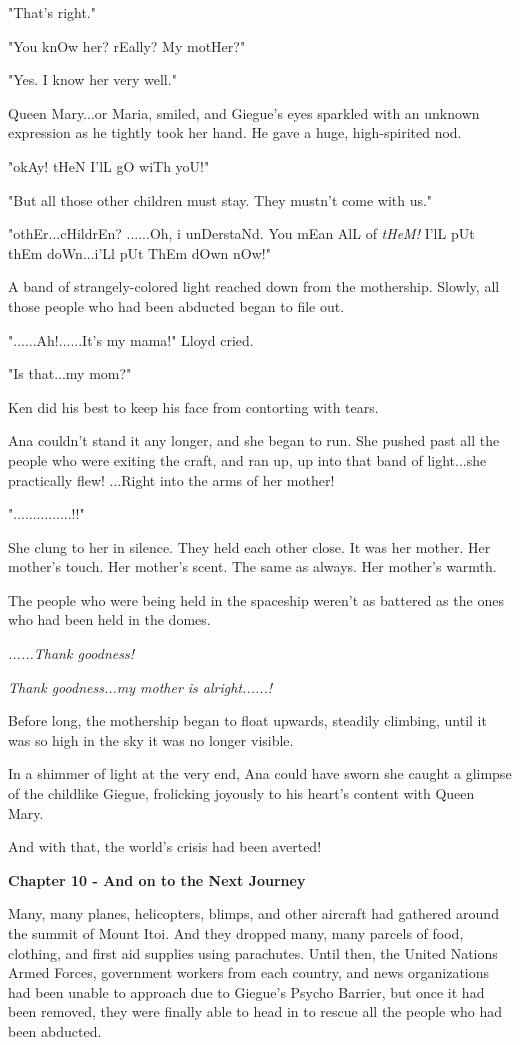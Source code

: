 \documentclass[
]{article}
\begin{document}
"That's right."

"You knOw her? rEally? My motHer?"

"Yes. I know her very well."

Queen Mary...or Maria, smiled, and Giegue's eyes sparkled with an
unknown expression as he tightly took her hand. He gave a huge,
high-spirited nod.

"okAy! tHeN I'lL gO wiTh yoU!"

"But all those other children must stay. They mustn't come with us."

"othEr...cHildrEn? ......Oh, i unDerstaNd. You mEan AlL of \emph{tHeM!}
I'lL pUt thEm doWn...i'Ll pUt ThEm dOwn nOw!"

A band of strangely-colored light reached down from the mothership.
Slowly, all those people who had been abducted began to file out.

"......Ah!......It's my mama!" Lloyd cried.

"Is that...my mom?"

Ken did his best to keep his face from contorting with tears.

Ana couldn't stand it any longer, and she began to run. She pushed past
all the people who were exiting the craft, and ran up, up into that band
of light...she practically flew! ...Right into the arms of her mother!

"...............!!"

She clung to her in silence. They held each other close. It was her
mother. Her mother's touch. Her mother's scent. The same as always. Her
mother's warmth.

The people who were being held in the spaceship weren't as battered as
the ones who had been held in the domes.

\emph{......Thank goodness!}

\emph{Thank goodness...my mother is alright......!}

Before long, the mothership began to float upwards, steadily climbing,
until it was so high in the sky it was no longer visible.

In a shimmer of light at the very end, Ana could have sworn she caught a
glimpse of the childlike Giegue, frolicking joyously to his heart's
content with Queen Mary.

And with that, the world's crisis had been averted!

\textbf{Chapter 10 - And on to the Next Journey}

Many, many planes, helicopters, blimps, and other aircraft had gathered
around the summit of Mount Itoi. And they dropped many, many parcels of
food, clothing, and first aid supplies using parachutes. Until then, the
United Nations Armed Forces, government workers from each country, and
news organizations had been unable to approach due to Giegue's Psycho
Barrier, but once it had been removed, they were finally able to head in
to rescue all the people who had been abducted.
\end{document}
